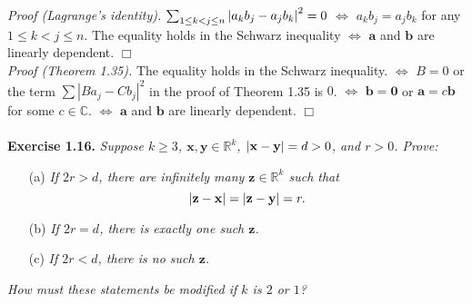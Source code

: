 \documentclass{article}
\begin{document}
\emph{Proof (Lagrange's identity).}
$\sum_{1 \leq k < j \leq n} \abs{ a_k b_j - a_j b_k }^2 = 0$
$\Longleftrightarrow$
$a_k b_j = a_j b_k$ for any $1 \leq k < j \leq n$.
The equality holds in the Schwarz inequality
$\Longleftrightarrow$
$\mathbf{a}$ and $\mathbf{b}$ are linearly dependent.
$\Box$ \\

\emph{Proof (Theorem 1.35).}
The equality holds in the Schwarz inequality.
$\Longleftrightarrow$
$B = 0$ or
the term $\sum |B a_j - C b_j|^2$ in the proof of Theorem 1.35 is $0$.
$\Longleftrightarrow$
$\mathbf{b} = \mathbf{0}$ or $\mathbf{a} = c\mathbf{b}$ for some $c \in \mathbb{C}$.
$\Longleftrightarrow$
$\mathbf{a}$ and $\mathbf{b}$ are linearly dependent.
$\Box$ \\\\






\textbf{Exercise 1.16.}
\emph{Suppose $k \geq 3$, $\mathbf{x}, \mathbf{y} \in \mathbb{R}^k$,
$\abs{\mathbf{x} - \mathbf{y}} = d > 0$, and $r > 0$. Prove:}
\begin{enumerate}
\item[(a)]
\emph{If $2r > d$, there are infinitely many $\mathbf{z} \in \mathbb{R}^k$
such that
$$\abs{\mathbf{z} - \mathbf{x}} = \abs{\mathbf{z} - \mathbf{y}} = r.$$}
\item[(b)]
\emph{If $2r = d$, there is exactly one such $\mathbf{z}$.}
\item[(c)]
\emph{If $2r < d$, there is no such $\mathbf{z}$.}
\end{enumerate}
\emph{How must these statements be modified if $k$ is $2$ or $1$?} \\
\end{document}
